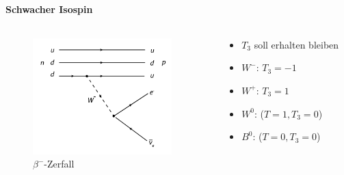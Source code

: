 \begin{iframe}
	\framesubtitle{Schwacher Isospin}
	\begin{columns}
		\begin{column}{0.48\textwidth}

			\begin{figure}
				\includegraphics[height=4.5cm]{img/betadecay}
		\caption*{$\beta^-$-Zerfall\cite{beta}}
		\end{figure}
	\end{column}
		\begin{column}{0.48\textwidth}

	\begin{itemize}
		\pause
		\item $T_3$ soll erhalten bleiben
		\pause
		\item $W^-$: $T_3=-1$
		\pause
		\item $W^+$: $T_3=1$
		\pause
		\item $W^0$: ($T=1,T_3=0$)
		\item $B^0$: ($T=0,T_3=0$)
	\end{itemize}
		\end{column}
	\end{columns}
	 {
	}
	\only<2> {
	}
	\only<3> {
	}
	\only<4> {
	}
	\only<5> {
	}
\end{iframe}

